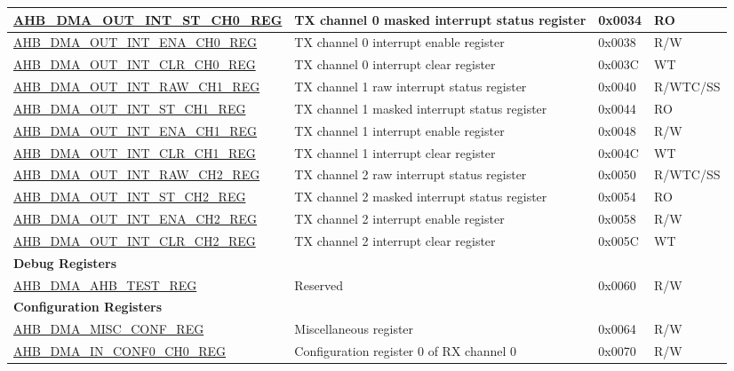 \begin{longtable}{ | p{8cm} | p{8cm} | p{1.3cm} | p{1.5cm} | }
\hyperref[regdesc:AHBDMAOUTINTSTCHNREG]{AHB\_DMA\_OUT\_INT\_ST\_CH0\_REG} & TX channel 0 masked interrupt status register & 0x0034 & RO \\ \hline
\hyperref[regdesc:AHBDMAOUTINTENACHNREG]{AHB\_DMA\_OUT\_INT\_ENA\_CH0\_REG} & TX channel 0 interrupt enable register & 0x0038 & R/W \\ \hline
\hyperref[regdesc:AHBDMAOUTINTCLRCHNREG]{AHB\_DMA\_OUT\_INT\_CLR\_CH0\_REG} & TX channel 0 interrupt clear register & 0x003C & WT \\ \hline
\hyperref[regdesc:AHBDMAOUTINTRAWCHNREG]{AHB\_DMA\_OUT\_INT\_RAW\_CH1\_REG} & TX channel 1 raw interrupt status register & 0x0040 & R/WTC/SS \\ \hline
\hyperref[regdesc:AHBDMAOUTINTSTCHNREG]{AHB\_DMA\_OUT\_INT\_ST\_CH1\_REG} & TX channel 1 masked interrupt status register & 0x0044 & RO \\ \hline
\hyperref[regdesc:AHBDMAOUTINTENACHNREG]{AHB\_DMA\_OUT\_INT\_ENA\_CH1\_REG} & TX channel 1 interrupt enable register & 0x0048 & R/W \\ \hline
\hyperref[regdesc:AHBDMAOUTINTCLRCHNREG]{AHB\_DMA\_OUT\_INT\_CLR\_CH1\_REG} & TX channel 1 interrupt clear register & 0x004C & WT \\ \hline
\hyperref[regdesc:AHBDMAOUTINTRAWCHNREG]{AHB\_DMA\_OUT\_INT\_RAW\_CH2\_REG} & TX channel 2 raw interrupt status register & 0x0050 & R/WTC/SS \\ \hline
\hyperref[regdesc:AHBDMAOUTINTSTCHNREG]{AHB\_DMA\_OUT\_INT\_ST\_CH2\_REG} & TX channel 2 masked interrupt status register & 0x0054 & RO \\ \hline
\hyperref[regdesc:AHBDMAOUTINTENACHNREG]{AHB\_DMA\_OUT\_INT\_ENA\_CH2\_REG} & TX channel 2 interrupt enable register & 0x0058 & R/W \\ \hline
\hyperref[regdesc:AHBDMAOUTINTCLRCHNREG]{AHB\_DMA\_OUT\_INT\_CLR\_CH2\_REG} & TX channel 2 interrupt clear register & 0x005C & WT \\ \hline
\multicolumn{4}{|l|}{\textbf{Debug Registers}} \\ \hline
\hyperref[regdesc:AHBDMAAHBTESTREG]{AHB\_DMA\_AHB\_TEST\_REG} & Reserved & 0x0060 & R/W \\ \hline
\multicolumn{4}{|l|}{\textbf{Configuration Registers}} \\ \hline
\hyperref[regdesc:AHBDMAMISCCONFREG]{AHB\_DMA\_MISC\_CONF\_REG} & Miscellaneous register & 0x0064 & R/W \\ \hline
\hyperref[regdesc:AHBDMAINCONF0CHNREG]{AHB\_DMA\_IN\_CONF0\_CH0\_REG} & Configuration register 0 of RX channel 0 & 0x0070 & R/W \\ \hline

\end{longtable}
